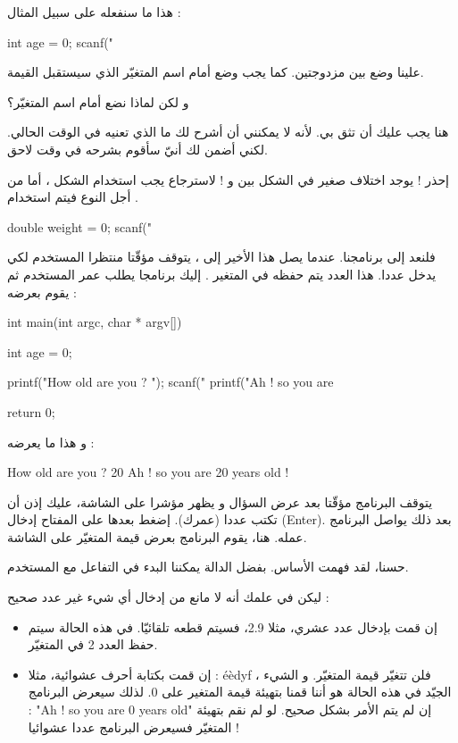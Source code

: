 هذا ما سنفعله على سبيل المثال :
\begin{Csource}
int age = 0;
scanf("%
\end{Csource}
علينا وضع
بين مزدوجتين. كما يجب وضع
\InlineCode{\&}
أمام اسم المتغيّر الذي سيستقبل القيمة.
\begin{question}
  و لكن لماذا نضع
\InlineCode{\&}
أمام اسم المتغيّر؟
\end{question}
هنا يجب عليك أن تثق بي. لأنه لا يمكنني أن أشرح لك ما الذي تعنيه في الوقت الحالي. لكني أضمن لك أنيّ سأقوم بشرحه في وقت لاحق.
\begin{critical}
  إحذر ! يوجد اختلاف صغير في الشكل بين
و
 ! لاسترجاع
يجب استخدام الشكل
، أما من أجل النوع
 فيتم استخدام
.
\end{critical}
\begin{Csource}
double weight = 0;
scanf("%
\end{Csource}
فلنعد إلى برنامجنا. عندما يصل هذا الأخير إلى
، يتوقف مؤقّتا منتظرا المستخدم لكي يدخل عددا. هذا العدد يتم حفظه في المتغير
.
إليك برنامجا يطلب عمر المستخدم ثم يقوم بعرضه :
\begin{Csource}
int main(int argc, char * argv[])
{
  int age = 0;

  printf("How old are you ? ");
  scanf("%
  printf("Ah ! so you are %

  return 0;
}
\end{Csource}
و هذا ما يعرضه :
\begin{Console}
How old are you ? 20
Ah ! so you are 20 years old !

\end{Console}
يتوقف البرنامج مؤقّتا بعد عرض السؤال و يظهر مؤشرا على الشاشة، عليك إذن أن تكتب عددا (عمرك). إضغط بعدها على المفتاح إدخال
(\textenglish{Enter}).
بعد ذلك يواصل البرنامج عمله. هنا، يقوم البرنامج بعرض قيمة المتغيّر
على الشاشة.

حسنا، لقد فهمت الأساس. بفضل الدالة
 يمكننا البدء في التفاعل مع المستخدم.

 ليكن في علمك أنه لا مانع من إدخال أي شيء غير عدد صحيح :
 \begin{itemize}
   \item إن قمت بإدخال عدد عشري، مثلا 2.9، فسيتم قطعه تلقائيّا. في هذه الحالة سيتم حفظ العدد 2 في المتغيّر.
   \item إن قمت بكتابة أحرف عشوائية، مثلا :
\textenglish{éèdyf}
، فلن تتغيّر قيمة المتغيّر. و الشيء الجيّد في هذه الحالة هو أننا قمنا بتهيئة قيمة المتغير على 0. لذلك سيعرض البرنامج :
"\textenglish{Ah ! so you are 0 years old}"
 إن لم يتم الأمر بشكل صحيح. لو لم نقم بتهيئة المتغيّر فسيعرض البرنامج عددا عشوائيا !
 \end{itemize}

